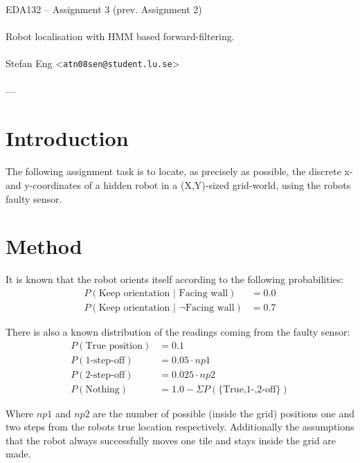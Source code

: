 \documentclass{article}
\begin{document}
  \begin{center}
    EDA132 -- Assignment 3 (prev. Assignment 2)\\
    \ \\
    {\Large Robot localisation with HMM based forward-filtering.} \\
    \ \\
    Stefan Eng <\texttt{atn08sen@student.lu.se}> \\
    \ \\
    ---
  \end{center}
  \vspace{-0.8cm}
  \section*{Introduction}

    The following assignment task is to locate, as precisely as possible, the
    discrete x- and y-coordinates of a hidden robot in a (X,Y)-sized
    grid-world, using the robots faulty sensor.

  \section*{Method}

    It is known that the robot orients itself according to the following
    probabilities:
    \begin{align*}
      P(\textrm{Keep orientation | Facing wall}) &= 0.0 \\
      P(\textrm{Keep orientation | $\neg$Facing wall}) &= 0.7
    \end{align*}

    There is also a known distribution of the readings coming from the faulty
    sensor:
    \begin{align*}
      P(\textrm{True position}) &= 0.1 \\
      P(\textrm{1-step-off}) &= 0.05 \cdot np1\\
      P(\textrm{2-step-off}) &= 0.025 \cdot np2\\
      P(\textrm{Nothing}) &= 1.0-\Sigma P(\textrm{\{True,1-,2-off\}})
    \end{align*}

    Where $np1$ and $np2$ are the number of possible (inside the grid)
    positions one and two steps from the robots true location respectively.
    Additionally the assumptions that the robot always successfully moves one
    tile and stays inside the grid are made. \\
\end{document}
